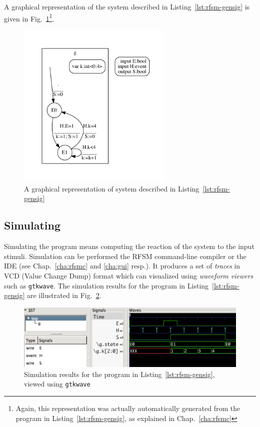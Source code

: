 \medskip
A graphical representation of the system described in Listing~\ref{lst:rfsm-gensig} is given in
Fig.~\ref{fig:rfsm-gensig-top}\footnote{Again, this representation was actually automatically generated from the
program in Listing~\ref{lst:rfsm-gensig}, as explained in Chap.~\ref{cha:rfsmc}}. 

\begin{figure}[!h]
   \includegraphics[height=8cm]{figs/gensig-top}
   \centering
  \caption{A graphical representation of system described in Listing~\ref{lst:rfsm-gensig}}
  \label{fig:rfsm-gensig-top}
\end{figure}

\subsection*{Simulating}
\label{sec:simulating-1}

Simulating the program means computing the reaction of the system to the input stimuli. Simulation
can be performed the RFSM command-line compiler or the IDE (see Chap.~\ref{cha:rfsmc} and \ref{cha:gui} resp.).
It produces a set of
\emph{traces} in VCD (Value Change Dump) format which can visualized using \emph{waveform viewers}
such as \texttt{gtkwave}. The simulation results for the program in Listing~\ref{lst:rfsm-gensig}
are illustrated in Fig.~\ref{fig:rfsm-gensig-chrono}.

\begin{figure}[!h]
   \includegraphics[width=\textwidth]{figs/gensig-chrono}
   \centering
  \caption{Simulation results for the program in Listing~\ref{lst:rfsm-gensig}, viewed using
    \texttt{gtkwave}}
  \label{fig:rfsm-gensig-chrono}
\end{figure}

